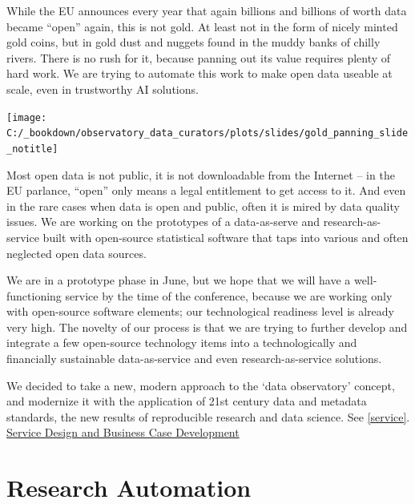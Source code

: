 \documentclass[
  a4paper,
  openany, a4paper, oneside]{book}
\begin{document}
While the EU announces every year that again billions and billions of worth data became ``open'' again, this is not gold. At least not in the form of nicely minted gold coins, but in gold dust and nuggets found in the muddy banks of chilly rivers. There is no rush for it, because panning out its value requires plenty of hard work. We are trying to automate this work to make open data useable at scale, even in trustworthy AI solutions.

\begin{center}\texttt{[image: C:/\_bookdown/observatory\_data\_curators/plots/slides/gold\_panning\_slide\_notitle]} \end{center}

Most open data is not public, it is not downloadable from the Internet -- in the EU parlance, ``open'' only means a legal entitlement to get access to it. And even in the rare cases when data is open and public, often it is mired by data quality issues. We are working on the prototypes of a data-as-serve and research-as-service built with open-source statistical software that taps into various and often neglected open data sources.

We are in a prototype phase in June, but we hope that we will have a well-functioning service by the time of the conference, because we are working only with open-source software elements; our technological readiness level is already very high. The novelty of our process is that we are trying to further develop and integrate a few open-source technology items into a technologically and financially sustainable data-as-service and even research-as-service solutions.

We decided to take a new, modern approach to the `data observatory' concept, and modernize it with the application of 21st century data and metadata standards, the new results of reproducible research and data science. See \ref{service}. \protect\hyperlink{service}{Service Design and Business Case Development}

\hypertarget{research-automation}{%
\section{Research Automation}\label{research-automation}}
\end{document}
